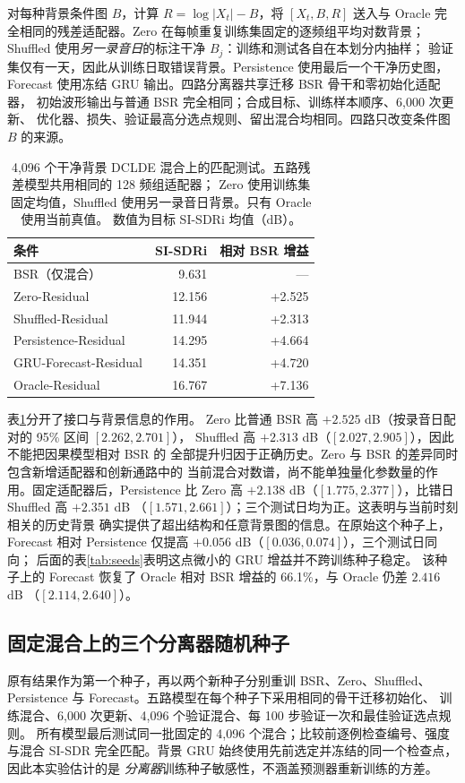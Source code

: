 \documentclass[conference]{IEEEtran}
\begin{document}
对每种背景条件图 $B$，计算 $R=\log|X_t|-B$，将 $[X_t,B,R]$
送入与 Oracle 完全相同的残差适配器。Zero 在每帧重复训练集固定的逐频组平均对数背景；
Shuffled 使用\emph{另一录音日}的标注干净 $B_j$：训练和测试各自在本划分内抽样；
验证集仅有一天，因此从训练日取错误背景。Persistence 使用最后一个干净历史图，
Forecast 使用冻结 GRU 输出。四路分离器共享迁移 BSR 骨干和零初始化适配器，
初始波形输出与普通 BSR 完全相同；合成目标、训练样本顺序、6,000 次更新、
优化器、损失、验证最高分选点规则、留出混合均相同。四路只改变条件图 $B$ 的来源。

\begin{table}[t]
\caption{4,096 个干净背景 DCLDE 混合上的匹配测试。五路残差模型共用相同的 128 频组适配器；
Zero 使用训练集固定均值，Shuffled 使用另一录音日背景。只有 Oracle 使用当前真值。
数值为目标 SI-SDRi 均值（dB）。}
\label{tab:causalresidual}\centering\footnotesize
\begin{tabular}{lrr}
\toprule
条件 & SI-SDRi & 相对 BSR 增益\\
\midrule
BSR（仅混合）&9.631&---\\
Zero-Residual&12.156&+2.525\\
Shuffled-Residual&11.944&+2.313\\
Persistence-Residual&14.295&+4.664\\
GRU-Forecast-Residual&14.351&+4.720\\
Oracle-Residual&16.767&+7.136\\
\bottomrule
\end{tabular}
\end{table}

表\ref{tab:causalresidual}分开了接口与背景信息的作用。
Zero 比普通 BSR 高 $+2.525$ dB（按录音日配对的 95\% 区间 $[2.262,2.701]$），
Shuffled 高 $+2.313$ dB（$[2.027,2.905]$），因此不能把因果模型相对 BSR 的
全部提升归因于正确历史。Zero 与 BSR 的差异同时包含新增适配器和创新通路中的
当前混合对数谱，尚不能单独量化参数量的作用。固定适配器后，Persistence 比 Zero
高 $+2.138$ dB（$[1.775,2.377]$），比错日 Shuffled 高 $+2.351$ dB
（$[1.571,2.661]$）；三个测试日均为正。这表明与当前时刻相关的历史背景
确实提供了超出结构和任意背景图的信息。在原始这个种子上，Forecast 相对
Persistence 仅提高 $+0.056$ dB（$[0.036,0.074]$），三个测试日同向；
后面的表\ref{tab:seeds}表明这点微小的 GRU 增益并不跨训练种子稳定。
该种子上的 Forecast 恢复了 Oracle 相对 BSR 增益的 66.1\%，与 Oracle 仍差 $2.416$ dB
（$[2.114,2.640]$）。

\subsection{固定混合上的三个分离器随机种子}
原有结果作为第一个种子，再以两个新种子分别重训 BSR、Zero、Shuffled、
Persistence 与 Forecast。五路模型在每个种子下采用相同的骨干迁移初始化、
训练混合、6,000 次更新、4,096 个验证混合、每 100 步验证一次和最佳验证选点规则。
所有模型最后测试同一批固定的 4,096 个混合；比较前逐例检查编号、强度与混合 SI-SDR
完全匹配。背景 GRU 始终使用先前选定并冻结的同一个检查点，因此本实验估计的是
\emph{分离器}训练种子敏感性，不涵盖预测器重新训练的方差。
\end{document}
